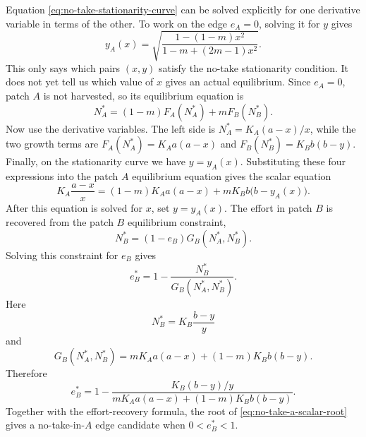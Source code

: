 \documentclass{article}
\numberwithin{equation}{section}
\begin{document}
Equation \eqref{eq:no-take-stationarity-curve} can be solved explicitly
for one derivative variable in terms of the other. To work on the edge
$e_A=0$, solving it for $y$ gives
\begin{equation*}
    y_A(x)
    =
    \sqrt{
        \frac{1-(1-m)x^2}
             {1-m+(2m-1)x^2}
    }.
\end{equation*}
This only says which pairs $(x,y)$ satisfy the no-take stationarity
condition. It does not yet tell us which value of $x$ gives an actual
equilibrium. Since $e_A=0$, patch $A$ is not harvested, so its
equilibrium equation is
\begin{equation*}
    N_A^*=(1-m)F_A(N_A^*)+mF_B(N_B^*).
\end{equation*}
Now use the derivative variables. The left side is
$N_A^*=K_A(a-x)/x$, while the two growth terms are
$F_A(N_A^*)=K_Aa(a-x)$ and
$F_B(N_B^*)=K_Bb(b-y)$. Finally, on the stationarity curve we have
$y=y_A(x)$. Substituting these four expressions into the patch $A$
equilibrium equation gives the scalar equation
\begin{equation}
    \label{eq:no-take-a-scalar-root}
    K_A\frac{a-x}{x}
    =
    (1-m)K_Aa(a-x)+mK_Bb\bigl(b-y_A(x)\bigr).
\end{equation}
After this equation is solved for $x$, set $y=y_A(x)$. The effort in
patch $B$ is recovered from the patch $B$ equilibrium constraint,
\begin{equation*}
    N_B^*=(1-e_B)G_B(N_A^*,N_B^*).
\end{equation*}
Solving this constraint for $e_B$ gives
\begin{equation*}
    e_B^*=1-\frac{N_B^*}{G_B(N_A^*,N_B^*)}.
\end{equation*}
Here
\begin{equation*}
    N_B^*=K_B\frac{b-y}{y}
\end{equation*}
and
\begin{equation*}
    G_B(N_A^*,N_B^*)
    =
    mK_Aa(a-x)+(1-m)K_Bb(b-y).
\end{equation*}
Therefore
\begin{equation*}
    e_B^*
    =
    1-
    \frac{K_B(b-y)/y}
         {mK_Aa(a-x)+(1-m)K_Bb(b-y)}.
\end{equation*}
Together with the effort-recovery formula, the root of
\eqref{eq:no-take-a-scalar-root} gives a no-take-in-$A$ edge candidate
when $0<e_B^*<1$.
\end{document}
